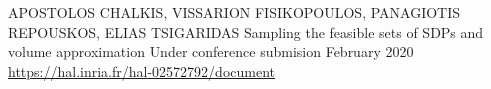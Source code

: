 

\begin{cventries}

  \cventry
    {APOSTOLOS CHALKIS, VISSARION FISIKOPOULOS, PANAGIOTIS REPOUSKOS, ELIAS TSIGARIDAS} %
    {Sampling the feasible sets of SDPs and volume approximation} %
    {Under conference submision} %
    {February 2020} %
    {\url{https://hal.inria.fr/hal-02572792/document}}


\end{cventries}
